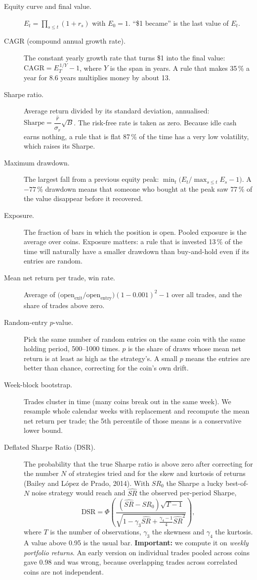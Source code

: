 \documentclass[11pt,a4paper]{article}
\begin{document}
\begin{description}
\item[Equity curve and final value.] $E_t=\prod_{s\le t}(1+r_s)$ with $E_0=1$. ``\$1 became'' is the last value of $E_t$.
\item[CAGR (compound annual growth rate).] The constant yearly growth rate that turns \$1 into the final value:
$\text{CAGR}=E_T^{\,1/Y}-1$, where $Y$ is the span in years. A rule that makes 35\,\% a year for 8.6 years multiplies money by about 13.
\item[Sharpe ratio.] Average return divided by its standard deviation, annualised:
$\text{Sharpe}=\dfrac{\bar r}{\sigma_r}\sqrt{B}$. The risk-free rate is taken as zero. Because idle cash earns nothing,
a rule that is flat 87\,\% of the time has a very low volatility, which raises its Sharpe.
\item[Maximum drawdown.] The largest fall from a previous equity peak: $\min_t\bigl(E_t/\max_{s\le t}E_s-1\bigr)$. A $-77$\,\% drawdown means that someone who
bought at the peak saw 77\,\% of the value disappear before it recovered.
\item[Exposure.] The fraction of bars in which the position is open. Pooled exposure is the average over coins.
Exposure matters: a rule that is invested 13\,\% of the time will naturally have a smaller drawdown than buy-and-hold even if its entries are random.
\item[Mean net return per trade, win rate.] Average of $\bigl(\text{open}_{\text{exit}}/\text{open}_{\text{entry}}\bigr)(1-0.001)^2-1$ over all trades, and the share of
trades above zero.
\item[Random-entry $p$-value.] Pick the same number of random entries on the same coin with the same holding period, 500--1000 times. $p$ is the share of draws whose mean net return
is at least as high as the strategy's. A small $p$ means the entries are better than chance, correcting for the coin's own drift.
\item[Week-block bootstrap.] Trades cluster in time (many coins break out in the same week). We resample whole calendar weeks with replacement and recompute the mean net return per
trade; the 5th percentile of those means is a conservative lower bound.
\item[Deflated Sharpe Ratio (DSR).] The probability that the true Sharpe ratio is above zero after correcting for the number $N$ of strategies tried and for the skew and kurtosis of returns
(Bailey and L\'opez de Prado, 2014). With $SR_0$ the Sharpe a lucky best-of-$N$ noise strategy would reach and $\hat{SR}$ the observed per-period Sharpe,
\[\text{DSR}=\Phi\!\left(\frac{(\hat{SR}-SR_0)\sqrt{T-1}}{\sqrt{1-\gamma_3\hat{SR}+\frac{\gamma_4-1}{4}\hat{SR}^2}}\right),\]
where $T$ is the number of observations, $\gamma_3$ the skewness and $\gamma_4$ the kurtosis. A value above 0.95 is the usual bar. \textbf{Important:} we compute it on \emph{weekly portfolio
returns}. An early version on individual trades pooled across coins gave 0.98 and was wrong, because overlapping trades across correlated coins are not independent.
\end{description}
\end{document}
